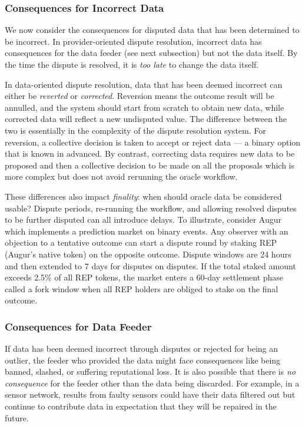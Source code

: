 \subsubsection{Consequences for Incorrect Data}

We now consider the consequences for disputed data that has been determined to be incorrect. In provider-oriented dispute resolution, incorrect data has consequences for the data feeder (see next subsection) but not the data itself. By the time the dispute is resolved, it is \textit{too late} to change the data itself. 

In data-oriented dispute resolution, data that has been deemed incorrect can either be \textit{reverted} or \textit{corrected}. Reversion means the outcome result will be annulled, and the system should start from scratch to obtain new data, while corrected data will reflect a new undisputed value. The difference between the two is essentially in the complexity of the dispute resolution system. For reversion, a collective decision is taken to accept or reject data --- a binary option that is known in advanced. By contrast, correcting data requires new data to be proposed and then a collective decision to be made on all the proposals which is more complex but does not avoid rerunning the oracle workflow.

These differences also impact \textit{finality}: when should oracle data be considered usable? Dispute periods, re-running the workflow, and allowing resolved disputes to be further disputed can all introduce delays. To illustrate, consider  Augur~\cite{peterson2015augur} which implements a prediction market on binary events. Any observer with an objection to a tentative outcome can start a dispute round by staking REP (Augur's native token) on the opposite outcome. Dispute windows are 24 hours and then extended to 7 days for disputes on disputes. If the total staked amount exceeds 2.5\% of all REP tokens, the market enters a 60-day settlement phase called a fork window when all REP holders are obliged to stake on the final outcome. 

\subsubsection{Consequences for Data Feeder}

If data has been deemed incorrect through disputes or rejected for being an outlier, the feeder who provided the data might face consequences like being banned, slashed, or suffering reputational loss. It is also possible that there is \textit{no consequence} for the feeder other than the data being discarded. For example, in a sensor network, results from faulty sensors could have their data filtered out but continue to contribute data in expectation that they will be repaired in the future. 

